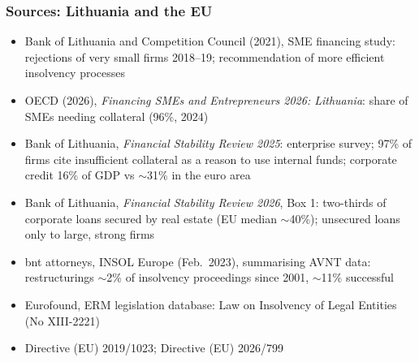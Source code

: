 \documentclass[aspectratio=169,xcolor=table]{beamer}
\begin{document}
\begin{frame}[label=sources] \frametitle{Sources: Lithuania and the EU \hfill \hyperlink{motivation}{}}

\footnotesize
\begin{itemize}
    \item Bank of Lithuania and Competition Council (2021), SME financing study: rejections of very small firms 2018--19; recommendation of more efficient insolvency processes
    \item OECD (2026), \textit{Financing SMEs and Entrepreneurs 2026: Lithuania}: share of SMEs needing collateral (96\%, 2024)
    \item Bank of Lithuania, \textit{Financial Stability Review 2025}: enterprise survey; 97\% of firms cite insufficient collateral as a reason to use internal funds; corporate credit 16\% of GDP vs $\sim$31\% in the euro area
    \item Bank of Lithuania, \textit{Financial Stability Review 2026}, Box 1: two-thirds of corporate loans secured by real estate (EU median $\sim$40\%); unsecured loans only to large, strong firms
    \item bnt attorneys, INSOL Europe (Feb.\ 2023), summarising AVNT data: restructurings $\sim$2\% of insolvency proceedings since 2001, $\sim$11\% successful
    \item Eurofound, ERM legislation database: Law on Insolvency of Legal Entities (No XIII-2221)
    \item Directive (EU) 2019/1023; Directive (EU) 2026/799
\end{itemize}

\end{frame}
\end{document}
